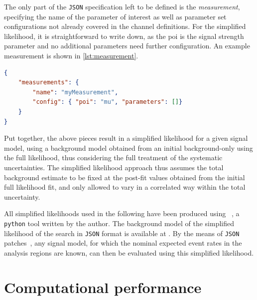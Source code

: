 The only part of the \texttt{JSON} specification left to be defined is the \textit{measurement}, specifying the name of the parameter of interest as well as parameter set configurations not already covered in the channel definitions. For the simplified likelihood, it is straightforward to write down, as the \gls{poi} is the signal strength parameter and no additional parameters need further configuration. An example measurement is shown in \cref{lst:measurement}.

\begin{minipage}{\linewidth}
\begin{lstlisting}[language=json,firstnumber=1,caption={Example of a measurement in the simplified likelihood. The signal strength is the parameter of interest, no additional parameters need further configuration.},captionpos=b, label=lst:measurement]
{
	"measurements": {
		"name": "myMeasurement",
		"config": { "poi": "mu", "parameters": []}
	}	
}
\end{lstlisting}
\end{minipage}

Put together, the above pieces result in a simplified likelihood for a given signal model, using a background model obtained from an initial background-only using the full likelihood, thus considering the full treatment of the systematic uncertainties.
The simplified likelihood approach thus assumes the total background estimate to be fixed at the post-fit values obtained from the initial full likelihood fit, and only allowed to vary in a correlated way within the total uncertainty.

All simplified likelihoods used in the following have been produced using ~\cite{simplify}, a \texttt{python} tool written by the author.
The background model of the simplified likelihood of the \onelepton search in \texttt{JSON} format is available at \cite{simplified_lh_SUSY-2019-08}.
By the means of \texttt{JSON} patches~\cite{json_patch}, any signal model, for which the nominal expected event rates in the analysis regions are known, can then be evaluated using this simplified likelihood.


\section{Computational performance}\label{sec:cpu_performance}

